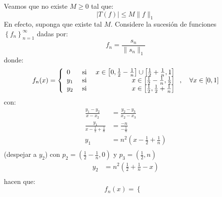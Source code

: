 \documentclass[12pt]{report}
\theoremstyle{largebreak}
\newcommand\abs[1]{\ensuremath{\left|#1\right|}}
\begin{document}
    \begin{sol}
        Veamos que no existe $M\geq0$ tal que:
        \begin{equation*}
            \abs{T(f)} \leq M\|f\|_1
        \end{equation*}
        En efecto, suponga que existe tal $M$. Considere la sucesión de funciones $\left\{f_n \right\}_{ n=1}^\infty$ dadas por:
        \begin{equation*}
            f_n=\frac{s_n}{\|s_n\|_1}
        \end{equation*}
        donde:
        \begin{equation*}
            f_n(x)=\left\{
                \begin{array}{lcr}
                    0 & \textup{ si } & x\in\left[0,\frac{1}{2}-\frac{1}{n} \right]\cup\left[\frac{1}{2}+\frac{1}{n},1 \right] \\
                    y_1 & \textup{ si } & x\in\left[\frac{1}{2}-\frac{1}{n},\frac{1}{2}\right] \\
                    y_2 & \textup{ si } & x\in\left[\frac{1}{2},\frac{1}{2}+\frac{1}{n}\right] \\
                \end{array}
            \right.,\quad\forall x\in[0,1]
        \end{equation*}
        con:
        \begin{equation*}
            \begin{split}
                \frac{y_1-y_2}{x-x_2}&=\frac{y_2-y_3}{x_2-x_3}\\
                \frac{y_1}{x-\frac{1}{2}+\frac{1}{n}}&=\frac{-n}{-\frac{1}{n}}\\
                y_1&=n^2\left(x-\frac{1}{2}+\frac{1}{n}\right) \\
            \end{split}
        \end{equation*}
        (despejar a $y_2$) con $p_2=\left(\frac{1}{2}-\frac{1}{n},0\right)$ y $p_3=\left(\frac{1}{2},n\right)$
        \begin{equation*}
            \begin{split}
                y_2&=n^2\left(\frac{1}{2}+\frac{1}{n}-x\right) \\
            \end{split}
        \end{equation*}
        hacen que:
        \begin{equation*}
            f_n(x)=\left\{
                \begin{array}{lcr}

\end{array}
\end{equation*}
\end{sol}
\end{document}

